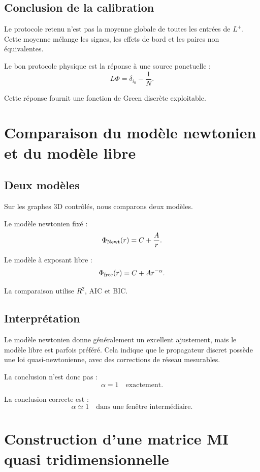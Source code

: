 \documentclass[11pt,a4paper]{article}
\begin{document}
\subsection{Conclusion de la calibration}

Le protocole retenu n'est pas la moyenne globale de toutes les entrées de
\(L^+\). Cette moyenne mélange les signes, les effets de bord et les paires non
équivalentes.

Le bon protocole physique est la réponse à une source ponctuelle :
\[
L\Phi=\delta_{i_0}-\frac{1}{N}.
\]

Cette réponse fournit une fonction de Green discrète exploitable.

\section{Comparaison du modèle newtonien et du modèle libre}

\subsection{Deux modèles}

Sur les graphes 3D contrôlés, nous comparons deux modèles.

Le modèle newtonien fixé :
\[
\Phi_{\rm Newt}(r)
=
C+\frac{A}{r}.
\]

Le modèle à exposant libre :
\[
\Phi_{\rm free}(r)
=
C+A r^{-\alpha}.
\]

La comparaison utilise \(R^2\), AIC et BIC.

\subsection{Interprétation}

Le modèle newtonien donne généralement un excellent ajustement, mais le modèle
libre est parfois préféré. Cela indique que le propagateur discret possède une
loi quasi-newtonienne, avec des corrections de réseau mesurables.

La conclusion n'est donc pas :
\[
\alpha=1
\quad
\text{exactement}.
\]

La conclusion correcte est :
\[
\boxed{
\alpha\simeq1
\quad
\text{dans une fenêtre intermédiaire.}
}
\]

\section{Construction d'une matrice MI quasi tridimensionnelle}
\end{document}
